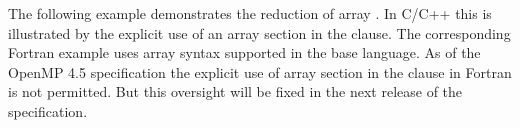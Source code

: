 

The following example demonstrates the reduction of array .  In C/C++ this is illustrated by the explicit use of an array section  in the  clause.  The corresponding Fortran example uses array syntax supported in the base language.  As of the OpenMP 4.5 specification the explicit use of array section in the  clause in Fortran is not permitted.  But this oversight will be fixed in the next release of the specification.



